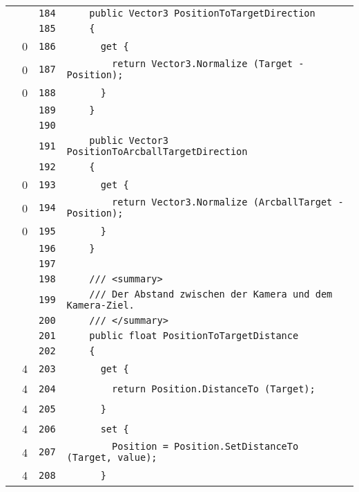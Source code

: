 \documentclass[a4paper,10pt]{article}
\begin{document}
\begin{longtable}[l]{lrrl}
\cellcolor{gray} &  & \verb~184~ & \verb~    public Vector3 PositionToTargetDirection~\\
\cellcolor{gray} &  & \verb~185~ & \verb~    {~\\
\cellcolor{red} & 0 & \verb~186~ & \verb~      get {~\\
\cellcolor{red} & 0 & \verb~187~ & \verb~        return Vector3.Normalize (Target - Position);~\\
\cellcolor{red} & 0 & \verb~188~ & \verb~      }~\\
\cellcolor{gray} &  & \verb~189~ & \verb~    }~\\
\cellcolor{gray} &  & \verb~190~ & \verb~~\\
\cellcolor{gray} &  & \verb~191~ & \verb~    public Vector3 PositionToArcballTargetDirection~\\
\cellcolor{gray} &  & \verb~192~ & \verb~    {~\\
\cellcolor{red} & 0 & \verb~193~ & \verb~      get {~\\
\cellcolor{red} & 0 & \verb~194~ & \verb~        return Vector3.Normalize (ArcballTarget - Position);~\\
\cellcolor{red} & 0 & \verb~195~ & \verb~      }~\\
\cellcolor{gray} &  & \verb~196~ & \verb~    }~\\
\cellcolor{gray} &  & \verb~197~ & \verb~~\\
\cellcolor{gray} &  & \verb~198~ & \verb~    /// <summary>~\\
\cellcolor{gray} &  & \verb~199~ & \verb~    /// Der Abstand zwischen der Kamera und dem Kamera-Ziel.~\\
\cellcolor{gray} &  & \verb~200~ & \verb~    /// </summary>~\\
\cellcolor{gray} &  & \verb~201~ & \verb~    public float PositionToTargetDistance~\\
\cellcolor{gray} &  & \verb~202~ & \verb~    {~\\
\cellcolor{green} & 4 & \verb~203~ & \verb~      get {~\\
\cellcolor{green} & 4 & \verb~204~ & \verb~        return Position.DistanceTo (Target);~\\
\cellcolor{green} & 4 & \verb~205~ & \verb~      }~\\
\cellcolor{green} & 4 & \verb~206~ & \verb~      set {~\\
\cellcolor{green} & 4 & \verb~207~ & \verb~        Position = Position.SetDistanceTo (Target, value);~\\
\cellcolor{green} & 4 & \verb~208~ & \verb~      }~\\

\end{longtable}
\end{document}
